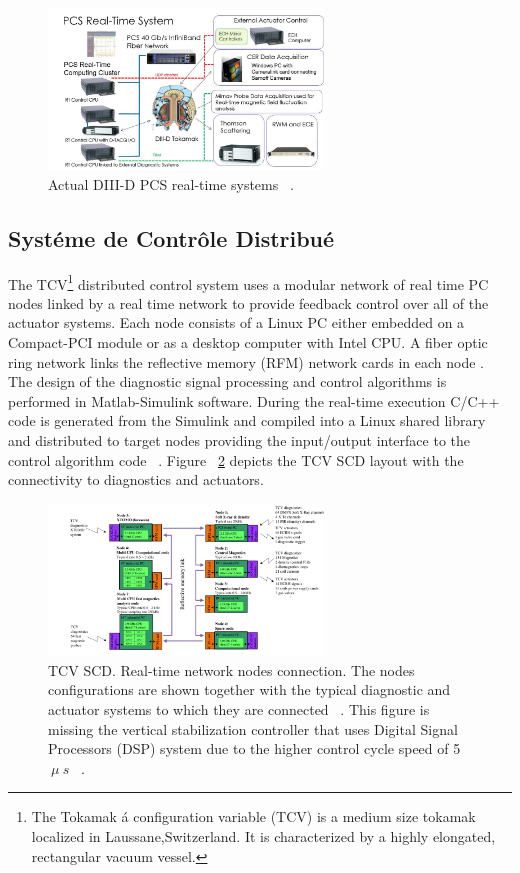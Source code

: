 \begin{figure}[htbp]
	\centering
	\includegraphics[width=0.65\textwidth]{Chp2/DIIIDPCSnew.PNG}
	\caption{\label{DIIInew} Actual DIII-D PCS real-time systems ~\cite{DIIIDnew}.  }
\end{figure}


\subsection{Syst\'eme de Contr\^ole Distribu\'e}

The TCV\footnote{The Tokamak \'a configuration variable (TCV) is  a medium size tokamak localized in Laussane,Switzerland. It is characterized by a highly elongated, rectangular vacuum vessel.} distributed control system uses a modular network of real time PC nodes linked by a real time network to provide feedback control over all of the actuator systems. Each node consists of a Linux PC either embedded on a Compact-PCI module or as a desktop computer with Intel CPU. A fiber optic ring network links the reflective memory (RFM) network cards in each node  \cite{TCVcntrl}.  The design of the diagnostic signal processing and control algorithms is performed in Matlab-Simulink software.  During the real-time execution  C/C++  code is generated from the Simulink and compiled  into a Linux shared library and distributed to target nodes  providing the input/output interface to the control algorithm code  ~\cite{TCVcntrl1}. Figure ~\ref{TCVcontrol} depicts the TCV SCD layout with the connectivity to diagnostics and actuators.


\begin{figure}[htbp]
	\centering
	\includegraphics[width=0.65\textwidth]{Chp2/TCVcntrl1.png}
	\caption{\label{TCVcontrol} TCV SCD. Real-time network nodes connection. The nodes configurations 	are shown together with the typical diagnostic and actuator systems to which they are connected  ~\cite{TCVcntrl1}. This figure is missing the vertical stabilization controller that uses  Digital Signal Processors (DSP) system due to the higher control cycle speed of 5$~ \mu~s$ ~\cite{NunoPhD}. }
\end{figure}

